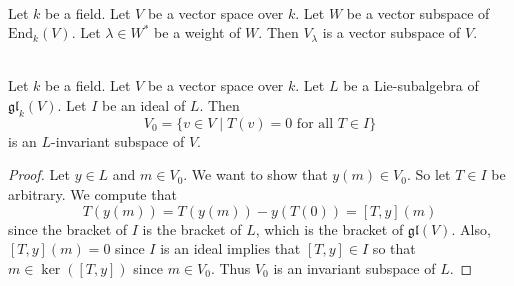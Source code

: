 \documentclass[a4paper]{article}
\begin{document}
\begin{lmm}{}{} \\Let $k$ be a field. Let $V$ be a vector space over $k$. Let $W$ be a vector subspace of $\text{End}_k(V)$. Let $\lambda\in W^\ast$ be a weight of $W$. Then $V_\lambda$ is a vector subspace of $V$. 
\end{lmm}

\begin{prp}{}{} \\Let $k$ be a field. Let $V$ be a vector space over $k$. Let $L$ be a Lie-subalgebra of $\mathfrak{gl}_k(V)$. Let $I$ be an ideal of $L$. Then $$V_0=\{v\in V\;|\;T(v)=0\text{ for all }T\in I\}$$ is an $L$-invariant subspace of $V$. 
\begin{proof}
Let $y\in L$ and $m\in V_0$. We want to show that $y(m)\in V_0$. So let $T\in I$ be arbitrary. We compute that $$T(y(m))=T(y(m))-y(T(0))=[T,y](m)$$ since the bracket of $I$ is the bracket of $L$, which is the bracket of $\mathfrak{gl}(V)$. Also, $[T,y](m)=0$ since $I$ is an ideal implies that $[T,y]\in I$ so that $m\in\ker([T,y])$ since $m\in V_0$. Thus $V_0$ is an invariant subspace of $L$. 
\end{proof}
\end{prp}
\end{document}
